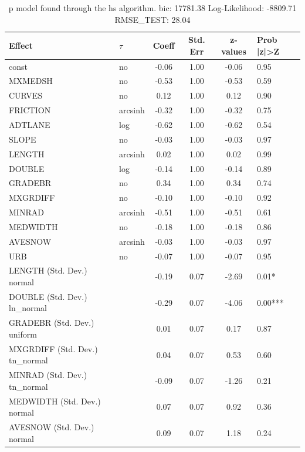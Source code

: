 \begin{table}
	\caption{p model found through the hs algorithm. bic: 17781.38 Log-Likelihood: -8809.71 RMSE_TEST: 28.04}
	\begin{center}
		\begin{tabular}{|l|l|c|c|c|l|}
			\hline
			Effect & $\tau$ & Coeff & Std. Err & z-values & Prob |z|>Z \\
			\hline
			const & no & -0.06 & 1.00 & -0.06 & 0.95 \\
			\hline
			MXMEDSH & no & -0.53 & 1.00 & -0.53 & 0.59 \\
			\hline
			CURVES & no & 0.12 & 1.00 & 0.12 & 0.90 \\
			\hline
			FRICTION & arcsinh & -0.32 & 1.00 & -0.32 & 0.75 \\
			\hline
			ADTLANE & log & -0.62 & 1.00 & -0.62 & 0.54 \\
			\hline
			SLOPE & no & -0.03 & 1.00 & -0.03 & 0.97 \\
			\hline
			LENGTH & arcsinh & 0.02 & 1.00 & 0.02 & 0.99 \\
			\hline
			DOUBLE & log & -0.14 & 1.00 & -0.14 & 0.89 \\
			\hline
			GRADEBR & no & 0.34 & 1.00 & 0.34 & 0.74 \\
			\hline
			MXGRDIFF & no & -0.10 & 1.00 & -0.10 & 0.92 \\
			\hline
			MINRAD & arcsinh & -0.51 & 1.00 & -0.51 & 0.61 \\
			\hline
			MEDWIDTH & no & -0.18 & 1.00 & -0.18 & 0.86 \\
			\hline
			AVESNOW & arcsinh & -0.03 & 1.00 & -0.03 & 0.97 \\
			\hline
			URB & no & -0.07 & 1.00 & -0.07 & 0.95 \\
			\hline
			LENGTH (Std. Dev.) normal &  & -0.19 & 0.07 & -2.69 & 0.01* \\
			\hline
			DOUBLE (Std. Dev.) ln_normal &  & -0.29 & 0.07 & -4.06 & 0.00*** \\
			\hline
			GRADEBR (Std. Dev.) uniform &  & 0.01 & 0.07 & 0.17 & 0.87 \\
			\hline
			MXGRDIFF (Std. Dev.) tn_normal &  & 0.04 & 0.07 & 0.53 & 0.60 \\
			\hline
			MINRAD (Std. Dev.) tn_normal &  & -0.09 & 0.07 & -1.26 & 0.21 \\
			\hline
			MEDWIDTH (Std. Dev.) normal &  & 0.07 & 0.07 & 0.92 & 0.36 \\
			\hline
			AVESNOW (Std. Dev.) normal &  & 0.09 & 0.07 & 1.18 & 0.24 \\

\end{tabular}
\end{center}
\end{table}
